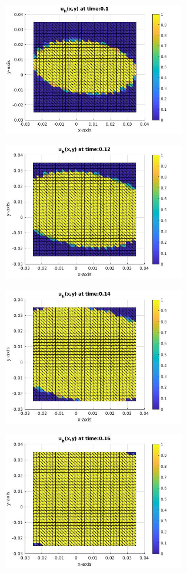 \documentclass[a4paper,11pt]{article}
\begin{document}
\begin{figure}[h]
\begin{subfigure}{0.4\textwidth}
	\end{subfigure}
	\begin{subfigure}{0.4\textwidth}
		\includegraphics[width = 8cm]{./tc1-2/010.jpg}
	\end{subfigure}
	\begin{subfigure}{0.4\textwidth}
		\includegraphics[width =8cm]{./tc1-2/012.jpg}
	\end{subfigure}
	\begin{subfigure}{0.4\textwidth}
		\includegraphics[width = 8cm]{./tc1-2/014.jpg}
	\end{subfigure}
	\begin{subfigure}{0.4\textwidth}
		\includegraphics[width =8cm]{./tc1-2/016.jpg}
	\end{subfigure}
\end{figure}
\restoregeometry
\newpage
\end{document}

